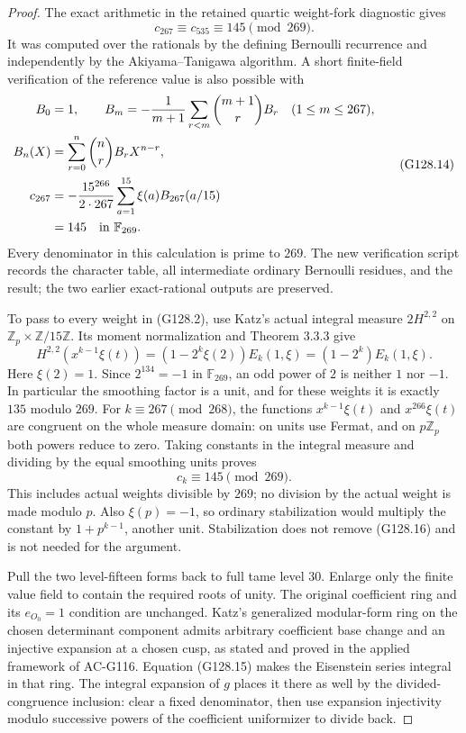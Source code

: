 \begin{proof}
The exact arithmetic in the retained quartic weight-fork
diagnostic gives
\[
                  c_{267}\equiv c_{535}\equiv145\pmod{269}.
 \tag{G128.13}
\]
It was computed over the rationals by the defining Bernoulli
recurrence and independently by the Akiyama--Tanigawa
algorithm.  A short finite-field verification of the reference
value is also possible with
\[
 \begin{aligned}
 B_0&=1,\qquad
 B_m=-\frac1{m+1}\sum_{r<m}\binom{m+1}{r}B_r
                                  \quad(1\le m\le267),\\
 B_n(X)&=\sum_{r=0}^n\binom nr B_rX^{n-r},\\
 c_{267}&=-\frac{15^{266}}{2\cdot267}
                    \sum_{a=1}^{15}\xi(a)B_{267}(a/15)\\
         &=145\quad\hbox{in }\mathbb F_{269}.
 \end{aligned}
 \tag{G128.14}
\]
Every denominator in this calculation is prime to \(269\).
The new verification script records the character table,
all intermediate ordinary Bernoulli residues, and the result;
the two earlier exact-rational outputs are preserved.

To pass to every weight in (G128.2), use Katz's actual integral
measure \(2H^{2,2}\) on
\(\mathbb Z_p\times\mathbb Z/15\mathbb Z\).  Its moment
normalization and Theorem 3.3.3 give
\[
 H^{2,2}(x^{k-1}\xi(t))=(1-2^k\xi(2))E_k(1,\xi)
                                      =(1-2^k)E_k(1,\xi).
 \tag{G128.15}
\]
Here \(\xi(2)=1\).  Since \(2^{134}=-1\) in \(\mathbb F_{269}\),
an odd power of \(2\) is neither \(1\) nor \(-1\).
In particular the smoothing factor is a unit, and for these
weights it is exactly \(135\) modulo \(269\).
For \(k\equiv267\pmod{268}\), the functions
\(x^{k-1}\xi(t)\) and \(x^{266}\xi(t)\) are congruent on
the whole measure domain: on units use Fermat, and on
\(p\mathbb Z_p\) both powers reduce to zero.
Taking constants in the integral measure and dividing by
the equal smoothing units proves
\[
                              c_k\equiv145\pmod{269}.
 \tag{G128.16}
\]
This includes actual weights divisible by \(269\); no division
by the actual weight is made modulo \(p\).
Also \(\xi(p)=-1\), so ordinary stabilization would multiply
the constant by \(1+p^{k-1}\), another unit.  Stabilization
does not remove (G128.16) and is not needed for the argument.

Pull the two level-fifteen forms back to full tame level \(30\).
Enlarge only the finite value field to contain the required
roots of unity.  The original coefficient ring and its
\(e_{O_0}=1\) condition are unchanged.
Katz's generalized modular-form ring on the chosen determinant
component admits arbitrary coefficient base change and an
injective expansion at a chosen cusp, as stated and proved
in the applied framework of AC-G116.
Equation (G128.15) makes the Eisenstein series integral in
that ring.  The integral expansion of \(g\) places it there
as well by the divided-congruence inclusion: clear a fixed
denominator, then use expansion injectivity modulo successive
powers of the coefficient uniformizer to divide back.


\end{proof}
